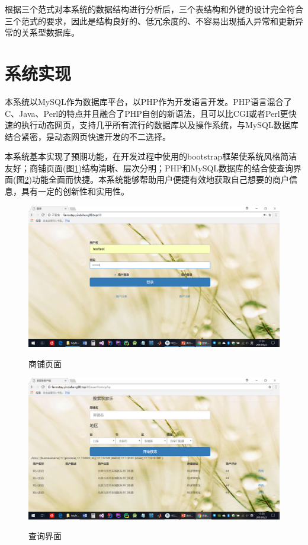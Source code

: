 \documentclass[]{article}
\begin{document}
	根据三个范式对本系统的数据结构进行分析后，三个表结构和外键的设计完全符合三个范式的要求，因此是结构良好的、低冗余度的、不容易出现插入异常和更新异常的关系型数据库。
	\section{系统实现}
	本系统以MySQL作为数据库平台，以PHP作为开发语言开发。PHP语言混合了C、Java、Perl的特点并且融合了PHP自创的新语法，且可以比CGI或者Perl更快速的执行动态网页，支持几乎所有流行的数据库以及操作系统，与MySQL数据库结合紧密，是动态网页快速开发的不二选择\cite{RN45}。
	
	本系统基本实现了预期功能，在开发过程中使用的bootstrap框架使系统风格简洁友好；商铺页面(图\ref{page-main})结构清晰、层次分明；PHP和MySQL数据库的结合使查询界面(图\ref{page-search})功能全面而快捷。本系统能够帮助用户便捷有效地获取自己想要的商户信息，具有一定的创新性和实用性。
	
	\begin{figure}
		\centering
		\includegraphics[width=\textwidth, keepaspectratio]{figures/page-main.png}\\
		\caption{商铺页面}\label{page-main}
	\end{figure}
	\begin{figure}
		\centering
		\includegraphics[width=\textwidth, keepaspectratio]{figures/page-search.png}\\
		\caption{查询界面}\label{page-search}
	\end{figure}
	
\end{document}
